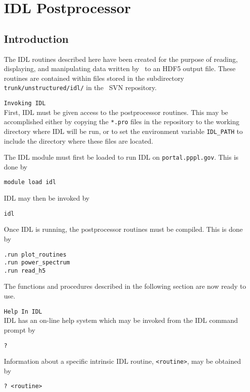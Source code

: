 \newcommand{\IDLf}[1]{\texttt{\textbf{#1}}}
\newcommand{\IDLa}[1]{\textit{#1}}
\newcommand{\IDLbool}{\texttt{bool}}
\newcommand{\IDLint}{\texttt{int}}
\newcommand{\IDLstr}{\texttt{string}}
\newcommand{\IDLflt}{\texttt{float}}
\newcommand{\IDLopt}[1]{$\langle$ #1 $\rangle$}

\section{IDL Postprocessor}

\subsection{Introduction}

The IDL routines described here have been created for the purpose of
reading, displaying, and manipulating data written by \codename\ to an
HDF5 output file.  These routines are contained within files stored in
the subdirectory \texttt{trunk/unstructured/idl/} in the \codename\ SVN
repository.

\texttt{Invoking IDL}
\\
First, IDL must be given access to the postprocessor routines.  This
may be accomplished either by copying the \texttt{*.pro} files in the
repository to the working directory where IDL will be run, or to set
the environment variable \texttt{IDL\_PATH} to include the directory
where these files are located.

The IDL module must first be loaded to run IDL on
\texttt{portal.pppl.gov}.  This is done by
\begin{verbatim}
module load idl
\end{verbatim}
IDL may then be invoked by
\begin{verbatim}
idl
\end{verbatim}
Once IDL is running, the postprocessor routines must be compiled.
This is done by
\begin{verbatim}
.run plot_routines
.run power_spectrum
.run read_h5
\end{verbatim}
The functions and procedures described in the following section are
now ready to use.

\texttt{Help In IDL}
\\

IDL has an on-line help system which may be invoked from the IDL
command prompt by
\begin{verbatim}
?
\end{verbatim}
Information about a specific intrinsic IDL routine,
\texttt{<routine>}, may be obtained by
\begin{verbatim}
? <routine>
\end{verbatim}


